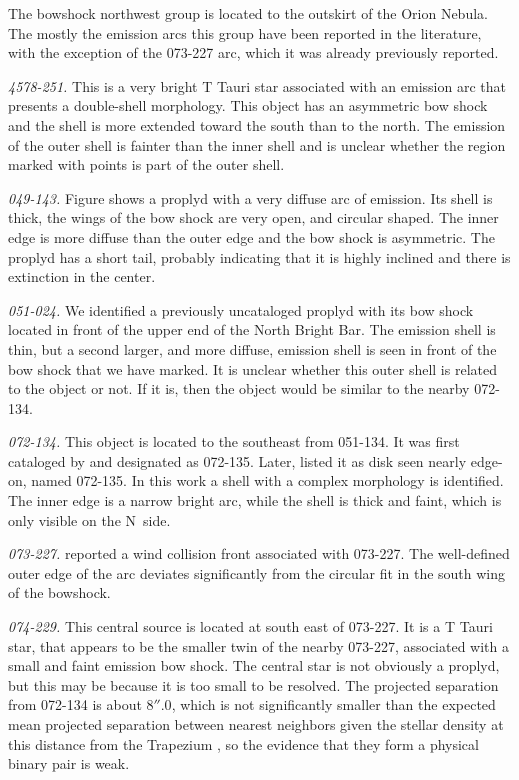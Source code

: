 \documentclass[apj, twocolumn]{aastex63}
\begin{document}
The bowshock northwest group is located to the outskirt of
the Orion Nebula. The mostly the emission arcs this group
have been reported in the literature, with the exception
of the  073-227 arc, which it was already previously reported.    

\textit{4578-251.} This is a very bright T Tauri star
associated with an emission arc that presents a double-shell
morphology. This object has an asymmetric bow shock and
the shell is more extended toward the south than to the north.
The emission of the outer shell is fainter than the inner
shell and is unclear whether the region marked with points
is part of the outer shell.

\textit{049-143.} Figure shows a proplyd \citep{Ricci:2008a}
with a very diffuse arc of emission. Its shell is thick,
the wings of the bow shock are very open, and circular
shaped. The inner edge is more diffuse than the outer edge
and the bow shock is asymmetric. The  proplyd has a short
tail, probably indicating that it is highly inclined and
there is extinction in the center. 
 
\textit{051-024.} We identified a previously uncataloged
proplyd with its bow shock located in front of the upper
end of the North Bright Bar. The emission shell is thin,
but a second larger, and more diffuse, emission shell is
seen in front of the bow shock that we have
marked. It is unclear whether this outer shell is related
to the object or not. If it is, then the object would be
similar to the nearby 072-134. 

\textit{072-134.} This object is located to the southeast
from 051-134. It was first cataloged by \citet{ODell:1996a}
and designated as 072-135. Later, \citet{Ricci:2008a} listed
it as disk seen nearly edge-on, named 072-135. In this work
a shell with a complex morphology is identified. The inner
edge is a narrow bright arc, while the shell is thick and
faint, which is only visible on the N~side.                 

\textit{073-227.} \citet{Bally:2000a} reported a wind
collision front associated with 073-227. The well-defined
outer edge of the arc deviates significantly from the
circular fit in the south wing of the bowshock.
   
\textit{074-229.} This central source is located at south
east of 073-227. It is a T Tauri star, that appears to be
the smaller twin of the nearby 073-227, associated with a
small and faint emission bow shock. The central star is
not obviously a proplyd, but this may be because it is too
small to be resolved. The projected separation from 072-134
is about \(8''.0\), which is not significantly smaller than
the expected mean projected separation between nearest
neighbors given the stellar density at this distance from
the Trapezium \citep{Reipurth:2007a}, 
so the evidence that they form a physical binary pair is weak.
\end{document}
